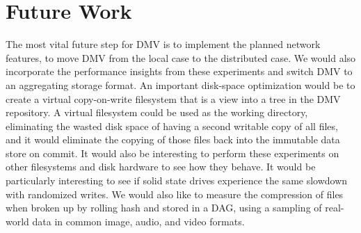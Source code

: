 \section{Future Work}

The most vital future step for DMV is to implement the planned network features, to move DMV from the local case to the distributed case.
We would also incorporate the performance insights from these experiments and switch DMV to an aggregating storage format.
An important disk-space optimization would be to create a virtual copy-on-write filesystem that is a view into a \gls{tree} in the \gls{DMV} repository.
A virtual filesystem could be used as the working directory, eliminating the wasted disk space of having a second writable copy of all files, and it would eliminate the copying of those files back into the immutable data store on \gls{commit}.
It would also be interesting to perform these experiments on other filesystems and disk hardware to see how they behave.
It would be particularly interesting to see if solid state drives experience the same slowdown with randomized writes.
We would also like to measure the compression of files when broken up by rolling hash and stored in a DAG, using a sampling of real-world data in common image, audio, and video formats.
